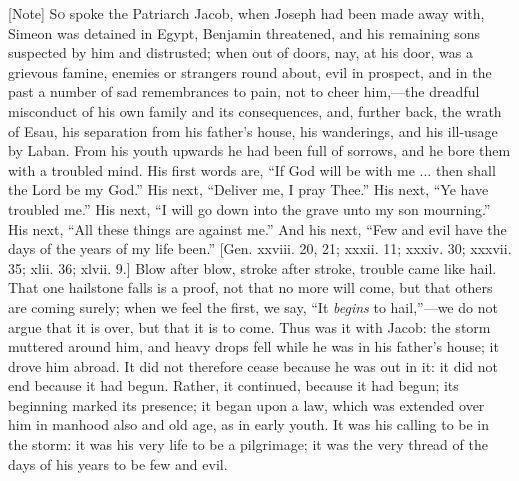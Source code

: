 [Note] S\textsc{o} spoke the Patriarch
Jacob, when Joseph had been made away with, Simeon was detained in
Egypt, Benjamin threatened, and his remaining sons suspected by him
and distrusted; when out of doors, nay, at his door, was a grievous
famine, enemies or strangers round about, evil in prospect, and in the
past a number of sad remembrances to pain, not to cheer him,—the
dreadful misconduct of his own family and its consequences, and,
further back, the wrath of Esau, his separation from his father's
house, his wanderings, and his ill-usage by Laban. From his youth
upwards he had been full of sorrows, and he bore them with a troubled
mind. His first words are, ``If God will be with me ... then shall
the Lord be my God.'' His next, ``Deliver me, I pray
Thee.'' His next, ``Ye have troubled me.'' His next,
``I will go down into the grave unto my son mourning.'' His
next, ``All these things are against me.'' And his next,
``Few and evil have the days of the years of my life been.''
[Gen. xxviii. 20, 21; xxxii. 11; xxxiv. 30; xxxvii. 35; xlii. 36;
xlvii. 9.] Blow after blow, stroke after stroke, trouble came like
hail. That one hailstone falls is a proof, not that no more will come,
but that others are coming surely; when we feel the first, we say,
``It \emph{begins} to hail,''—we do not argue that it is
over, but that it is to come. Thus was it with Jacob: the storm
muttered around him, and heavy drops fell while he was in his father's
house; it drove him abroad. It did not therefore cease because he was
out in it: it did not end because it had begun. Rather, it continued,
because it had begun; its beginning marked its presence; it began upon
a law, which was extended over him in manhood also and old age, as in
early youth. It was his calling to be in the storm: it was his very
life to be a pilgrimage; it was the very thread of the days of his
years to be few and evil.

